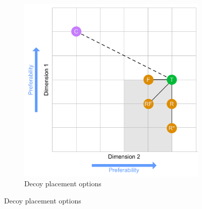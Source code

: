 
\begin{figure}[!htbp]
	\centering
	\begin{subfigure}[t]{0.49\textwidth}
		\includegraphics[width=\textwidth]{figures/decoy/decoy-dimensions-general}
		\caption{\label{fig:decoy:general-construction}Decoy placement options \cite{Huber1982AsymetricallyDominated}}
		

\end{subfigure}
\end{figure}
